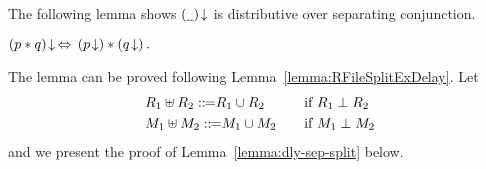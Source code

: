 The following lemma shows ${(\underline{\ \,})}\!\downarrow$ is distributive
over separating conjunction.
\begin{lemma} %
\label{lemma:dly-sep-split}
$
{(p * q)}\!\downarrow \,\Leftrightarrow\, ({p}\!\downarrow) * ({q}\!\downarrow)\,.
$
\end{lemma}
The lemma can be proved following 
Lemma~\ref{lemma:RFileSplitExDelay}. Let 
\[
	\begin{array}{ll}
		R_1\uplus R_2 ::\!\!{=} 
		R_1\cup R_2 \quad 
		& \text{if} \ R_1\perp R_2 \\ \\[-9pt]
		M_1\uplus M_2 ::\!\!{=} 
		M_1\cup M_2 \quad 
		& \text{if} \ M_1\perp M_2
	\end{array}
\]
and we present the proof of 
Lemma~\ref{lemma:dly-sep-split} below.
